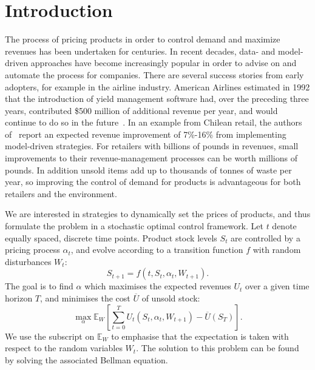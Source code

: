 \documentclass[main.tex]{subfiles}
\begin{document}
\listoftodos

\section{Introduction}
The process of pricing products in order to control demand and
maximize revenues has been undertaken for centuries. In recent
decades, data- and model-driven approaches have become increasingly
popular in order to advise on and automate the process for companies.
There are several success stories from early adopters, for example in
the airline industry.
American Airlines estimated in 1992 that the introduction of yield
management software had, over the preceding three
years, contributed \$500 million of additional revenue per year,
and would continue to do so in the future~\cite{smith1992yield}.
In an example from Chilean retail, the authors of~\cite{bitran1998coordinating}
report an expected revenue improvement of 7\%-16\% from implementing
model-driven strategies.
For retailers with billions of pounds in revenues, small
improvements to their revenue-management processes can be worth millions
of pounds.
In addition unsold items add up to thousands of tonnes of waste per year, so
improving the control of demand for products is advantageous
for both retailers and the environment.

We are interested in strategies to dynamically set the prices of
products, and thus
formulate the problem in a stochastic optimal control framework.
Let $t$ denote equally spaced, discrete time points.
Product stock levels $S_t$ are controlled by a pricing process
$\alpha_t$, and evolve according to a transition function $f$ with random disturbances
$W_t$:
\begin{equation}
  S_{t+1}=f(t,S_t,\alpha_t,W_{t+1}).
\end{equation}
The goal is to find $\alpha$ which maximises the expected revenues $U_t$ over a
given time horizon $T$, and
minimises the cost $\overline{U}$ of unsold stock:
\begin{equation}
  \max_{\alpha}\mathbb E_W\left[ \sum_{t=0}^TU_t(S_t,\alpha_t,W_{t+1})
    - \overline{U}(S_T)\right].
\end{equation}
We use the subscript on $\mathbb E_W$ to emphasise that the
expectation is taken with respect to the random variables $W_t$.
The solution to this problem can be found by solving the associated
Bellman equation.
\end{document}
